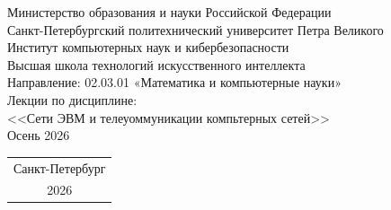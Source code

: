 {
\thispagestyle{empty}
\begin{center}
    \hfill \break
    \hfill \break
    Министерство образования и науки Российской Федерации\\[3pt]
    Санкт-Петербургский политехнический университет Петра Великого\\[10pt]
    Институт компьютерных наук и кибербезопасности\\[3pt]
    Высшая школа технологий искусственного интеллекта\\[3pt]
    Направление: 02.03.01 «Математика и компьютерные науки»\\
    [150pt]

    \large Лекции по дисциплине:\\[5pt]
    \large <<Сети ЭВМ и телеуоммуникации компьтерных сетей>>\\[10pt]
    \large Осень 2026\\[5pt]
\end{center}

\vspace{95pt}

\vfill
\begin{center}
    \begin{tabular}{c}
        Санкт-Петербург \\
        2026
    \end{tabular}
    \vspace{-40pt}
\end{center}
\newpage
}
